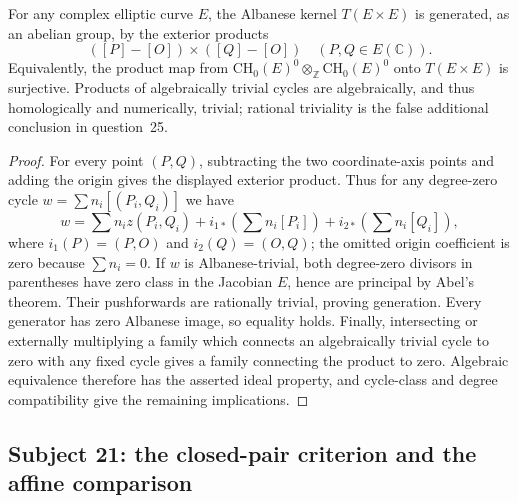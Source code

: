 \begin{proposition}\label{B:alb-kernel}
For any complex elliptic curve $E$, the Albanese kernel $T(E\times E)$ is generated, as an abelian group, by the exterior products
\[
 ([P]-[O])\times([Q]-[O])
\quad (P,Q\in E(\mathbb C)).
\]
Equivalently, the product map from $\mathrm{CH}_0(E)^0\otimes_{\mathbb Z}\mathrm{CH}_0(E)^0$ onto $T(E\times E)$ is surjective. Products of algebraically trivial cycles are algebraically, and thus homologically and numerically, trivial; rational triviality is the false additional conclusion in question~25.
\end{proposition}
\begin{proof}
For every point $(P,Q)$, subtracting the two coordinate-axis points and adding the origin gives the displayed exterior product. Thus for any degree-zero cycle $w=\sum n_i[(P_i,Q_i)]$ we have
\[
 w=\sum n_i z(P_i,Q_i)
  +i_{1*}\!\left(\sum n_i[P_i]\right)
  +i_{2*}\!\left(\sum n_i[Q_i]\right),
\]
where $i_1(P)=(P,O)$ and $i_2(Q)=(O,Q)$; the omitted origin coefficient is zero because $\sum n_i=0$. If $w$ is Albanese-trivial, both degree-zero divisors in parentheses have zero class in the Jacobian $E$, hence are principal by Abel's theorem. Their pushforwards are rationally trivial, proving generation. Every generator has zero Albanese image, so equality holds. Finally, intersecting or externally multiplying a family which connects an algebraically trivial cycle to zero with any fixed cycle gives a family connecting the product to zero. Algebraic equivalence therefore has the asserted ideal property, and cycle-class and degree compatibility give the remaining implications.
\end{proof}

\subsection{Subject 21: the closed-pair criterion and the affine comparison}


